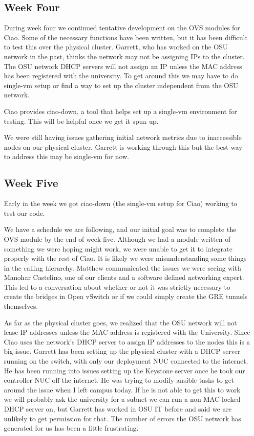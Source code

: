 \documentclass[10pt,onecolumn,journal,draftclsnofoot]{IEEEtran}
\begin{document}
\subsection{Week Four}

During week four we continued tentative development on the OVS modules for Ciao.
Some of the necessary functions have been written, but it has been difficult to
test this over the physical cluster. Garrett, who has worked on the OSU network
in the past, thinks the network may not be assigning IPs to the cluster. The OSU
network DHCP servers will not assign an IP unless the MAC address has been
registered with the university. To get around this we may have to do single-vm
setup or find a way to set up the cluster independent from the OSU network.

Ciao provides ciao-down, a tool that helps set up a single-vm environment for
testing. This will be helpful once we get it spun up.

We were still having issues gathering initial network metrics due to
inaccessible nodes on our physical cluster. Garrett is working through this but
the best way to address this may be single-vm for now.

\subsection{Week Five}

Early in the week we got ciao-down (the single-vm setup for Ciao) working to
test our code.

We have a schedule we are following, and our initial goal was to complete the
OVS module by the end of week five. Although we had a module written of
something we were hoping might work, we were unable to get it to integrate
properly with the rest of Ciao.  It is likely we were misunderstanding some
things in the calling hierarchy.  Matthew communicated the issues we were seeing
with Manohar Castelino, one of our clients and a software defined networking
expert. This led to a conversation about whether or not it was strictly
necessary to create the bridges in Open vSwitch or if we could simply create the
GRE tunnels themselves.

As far as the physical cluster goes, we realized that the OSU network will not
lease IP addresses unless the MAC address is registered with the University.
Since Ciao uses the network's DHCP server to assign IP addresses to the nodes
this is a big issue. Garrett has been setting up the physical cluster with a
DHCP server running on the switch, with only our deployment NUC connected to the
internet. He has been running into issues setting up the Keystone server once he
took our controller NUC off the internet. He was trying to modify ansible tasks
to get around the issue when I left campus today. If he is not able to get this
to work we will probably ask the university for a subnet we can run a
non-MAC-locked DHCP server on, but Garrett has worked in OSU IT before and said
we are unlikely to get permission for that. The number of errors the OSU network
has generated for us has been a little frustrating.
\end{document}
